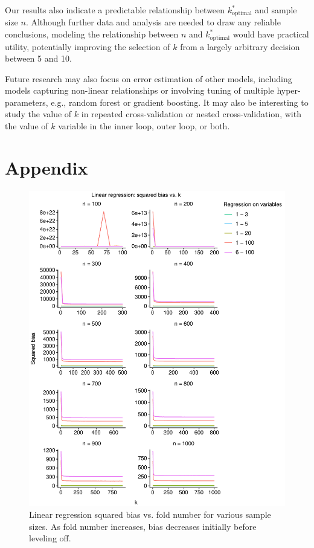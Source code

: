 \documentclass[
  12pt,
]{article}
\begin{document}
Our results also indicate a predictable relationship between
\(k_\mathrm{optimal}^*\) and sample size \(n\). Although further data
and analysis are needed to draw any reliable conclusions, modeling the
relationship between \(n\) and \(k_\mathrm{optimal}^*\) would have
practical utility, potentially improving the selection of \(k\) from a
largely arbitrary decision between 5 and 10.

Future research may also focus on error estimation of other models,
including models capturing non-linear relationships or involving tuning
of multiple hyper-parameters, e.g., random forest or gradient boosting.
It may also be interesting to study the value of \(k\) in repeated
cross-validation or nested cross-validation, with the value of \(k\)
variable in the inner loop, outer loop, or both.

\hypertarget{appendix}{%
\section{Appendix}\label{appendix}}

\begin{figure}[H]

{\centering \includegraphics{manuscript_files/figure-latex/unnamed-chunk-1-1} 

}

\caption{Linear regression squared bias vs. fold number for various sample sizes. As fold number increases, bias decreases initially before leveling off.}\label{fig:unnamed-chunk-1}
\end{figure}
\end{document}
